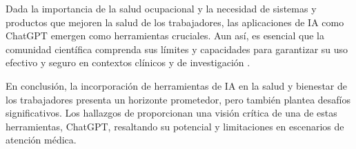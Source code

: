 Dada la importancia de la salud ocupacional y la necesidad de sistemas y productos que mejoren la salud de los trabajadores, las aplicaciones de IA como ChatGPT emergen como herramientas cruciales. Aun así, es esencial que la comunidad científica comprenda sus límites y capacidades para garantizar su uso efectivo y seguro en contextos clínicos y de investigación \citep{Cascella2023EvaluatingScenarios}.

En conclusión, la incorporación de herramientas de IA en la salud y bienestar de los trabajadores presenta un horizonte prometedor, pero también plantea desafíos significativos. Los hallazgos de \citet{Cascella2023EvaluatingScenarios} proporcionan una visión crítica de una de estas herramientas, ChatGPT, resaltando su potencial y limitaciones en escenarios de atención médica.










